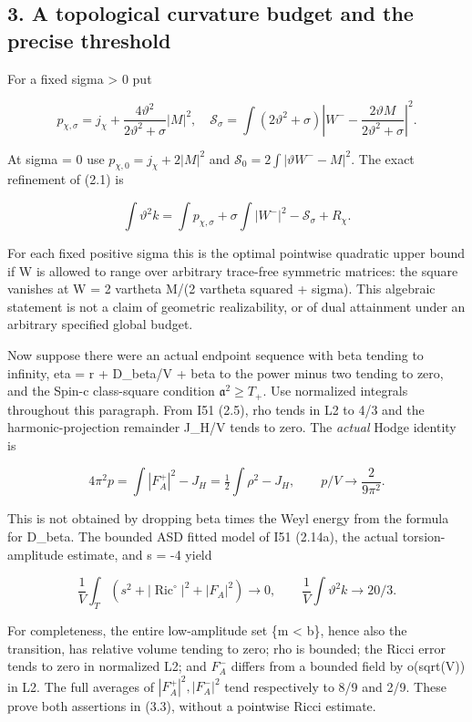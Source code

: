 \documentclass[
  10pt,
]{article}
\begin{document}
\hypertarget{a-topological-curvature-budget-and-the-precise-threshold}{%
\subsection{3. A topological curvature budget and the precise
threshold}\label{a-topological-curvature-budget-and-the-precise-threshold}}

For a fixed sigma \textgreater{} 0 put

\[
 p_{\chi,\sigma}=j_\chi+
                   \frac{4\vartheta^2}{2\vartheta^2+\sigma}|M|^2,
 \quad
 \mathcal S_\sigma=\int(2\vartheta^2+\sigma)
        \left|W^--\frac{2\vartheta M}{2\vartheta^2+\sigma}\right|^2.
\]

At sigma = 0 use \(p_{\chi,0}=j_\chi+2|M|^2\) and
\(\mathcal S_0=2\int|\vartheta W^--M|^2\). The exact refinement of (2.1)
is

\[
 \boxed{\int\vartheta^2k
    =\int p_{\chi,\sigma}+\sigma\int|W^-|^2
                                  -\mathcal S_\sigma+R_\chi.}   \tag{3.1}
\]

For each fixed positive sigma this is the optimal pointwise quadratic
upper bound if W is allowed to range over arbitrary trace-free symmetric
matrices: the square vanishes at W = 2 vartheta M/(2 vartheta squared +
sigma). This algebraic statement is not a claim of geometric
realizability, or of dual attainment under an arbitrary specified global
budget.

Now suppose there were an actual endpoint sequence with beta tending to
infinity, eta = r + D\_beta/V + beta to the power minus two tending to
zero, and the Spin-c class-square condition \(\mathfrak a^2\ge T_+\).
Use normalized integrals throughout this paragraph. From I51 (2.5), rho
tends in L2 to 4/3 and the harmonic-projection remainder J\_H/V tends to
zero. The \emph{actual} Hodge identity is

\[
 4\pi^2p=\int|F_A^+|^2-J_H=\tfrac12\int\rho^2-J_H,
 \qquad p/V\longrightarrow\frac2{9\pi^2}.                \tag{3.2}
\]

This is not obtained by dropping beta times the Weyl energy from the
formula for D\_beta. The bounded ASD fitted model of I51 (2.14a), the
actual torsion-amplitude estimate, and s = -4 yield

\[
 \frac1V\int_T(s^2+|\operatorname{Ric}^{\circ}|^2+|F_A|^2)\to0,
 \qquad
 \frac1V\int\vartheta^2k\to20/3.                         \tag{3.3}
\]

For completeness, the entire low-amplitude set \{m \textless{} b\},
hence also the transition, has relative volume tending to zero; rho is
bounded; the Ricci error tends to zero in normalized L2; and \(F_A^-\)
differs from a bounded field by o(sqrt(V)) in L2. The full averages of
\(|F_A^+|^2,|F_A^-|^2\) tend respectively to 8/9 and 2/9. These prove
both assertions in (3.3), without a pointwise Ricci estimate.
\end{document}
